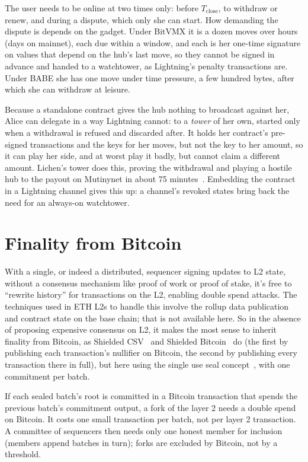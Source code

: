 \documentclass[11pt]{article}
\newcommand{\Tc}{T_{\mathrm{close}}}
\begin{document}
The user needs to be online at two times only: before $\Tc$, to withdraw or
renew, and during a dispute, which only she can start. How demanding the
dispute is depends on the gadget. Under BitVMX it is a dozen moves over
hours (days on mainnet), each due within a window, and each is her
one-time signature on values that depend on the hub's last move, so they
cannot be signed in advance and handed to a watchtower, as Lightning's
penalty transactions are. Under BABE she has one move under time
pressure, a few hundred bytes, after which she can withdraw at leisure.

Because a standalone contract gives the hub nothing to broadcast against
her, Alice can delegate in a way Lightning cannot: to a \emph{tower} of
her own, started only when a withdrawal is refused and discarded after.
It holds her contract's pre-signed transactions and the keys for her
moves, but not the key to her amount, so it can play her side, and at
worst play it badly, but cannot claim a different amount. Lichen's tower
does this, proving the withdrawal and playing a hostile hub to the payout
on Mutinynet in about 75 minutes~\cite[\S 10]{lichenbitvmx}. Embedding
the contract in a Lightning channel gives this up: a channel's revoked
states bring back the need for an always-on watchtower.

\section{Finality from Bitcoin}
\label{sec:finality}

With a single, or indeed a distributed, sequencer signing updates to L2 state, without a consensus mechanism like proof of work or proof of stake, it's free to ``rewrite history'' for transactions on the L2, enabling double spend attacks. The techniques used in ETH L2s to handle this involve the rollup data publication and contract state on the base chain; that is not available here. So in the absence of proposing expensive consensus on L2, it makes the most sense to inherit finality from Bitcoin, as Shielded CSV~\cite{shieldedcsv} and Shielded Bitcoin~\cite{shieldedbtc} do (the first by publishing each transaction's nullifier on Bitcoin, the second by publishing every transaction there in full), but here using the single use seal concept~\cite{toddseals}, with one commitment per batch.

If each sealed batch's root is committed in a Bitcoin transaction that spends the previous batch's commitment output, a fork of the layer 2 needs a double spend on Bitcoin. It costs one small transaction per batch, not per layer 2 transaction. A committee of sequencers then needs only one honest member for inclusion (members append batches in turn); forks are excluded by Bitcoin, not by a threshold.
\end{document}
